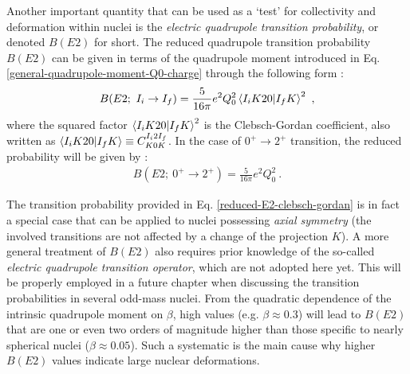 Another important quantity that can be used as a `test' for collectivity and deformation within nuclei is the \emph{electric quadrupole transition probability}, or denoted $B(E2)$ for short. The reduced quadrupole transition probability $B(E2)$ can be given in terms of the quadrupole moment introduced in Eq. \ref{general-quadrupole-moment-Q0-charge} through the following form \cite{bohr1998nuclear}:
\begin{align}
    B(E2;\ I_i\to I_f)=\frac{5}{16\pi}e^2Q_0^2\bra{I_iK20}\ket{I_fK}^2\ ,
    \label{reduced-E2-clebsch-gordan}
\end{align}
where the squared factor $\bra{I_iK20}\ket{I_fK}^2$ is the Clebsch-Gordan coefficient, also written as $\bra{I_iK20}\ket{I_fK}\equiv C^{I_i2I_f}_{K0K}$. In the case of $0^+\to 2^+$ transition, the reduced probability will be given by \cite{casten2000nuclear}:
\begin{align}
    B(E2;\ 0^+\to 2^+)=\frac{5}{16\pi}e^2Q_0^2\ .
    \label{reduced-E2-0Plus-2Plus-Transition}
\end{align}

The transition probability provided in Eq. \ref{reduced-E2-clebsch-gordan} is in fact a special case that can be applied to nuclei possessing \emph{axial symmetry} (the involved transitions are not affected by a change of the projection $K$). A more general treatment of $B(E2)$ also requires prior knowledge of the so-called \emph{electric quadrupole transition operator}, which are not adopted here yet. This will be properly employed in a future chapter when discussing the transition probabilities in several odd-mass nuclei. From the quadratic dependence of the intrinsic quadrupole moment on $\beta$, high values (e.g. $\beta\approx 0.3$) will lead to $B(E2)$ that are one or even two orders of magnitude higher than those specific to nearly spherical nuclei ($\beta\approx 0.05$). Such a systematic is the main cause why higher $B(E2)$ values indicate large nuclear deformations.

